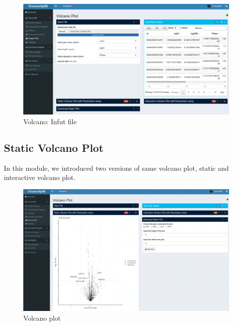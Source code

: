 \documentclass[
  a4paper,
  oneside,
  open=any]{scrreport}
\begin{document}
\begin{figure}[H]

{\centering \includegraphics{./_images/volcano/volcano1.png}

}

\caption{\label{fig-vol1}Volcano: Infut file}

\end{figure}

\hypertarget{static-volcano-plot}{%
\subsection{Static Volcano Plot}\label{static-volcano-plot}}

In this module, we introduced two versions of same volcano plot, static
and interactive volcano plot.

\begin{figure}[H]

{\centering \includegraphics{./_images/volcano/volcano2.png}

}

\caption{\label{fig-volstat}Volcano plot}

\end{figure}
\end{document}
